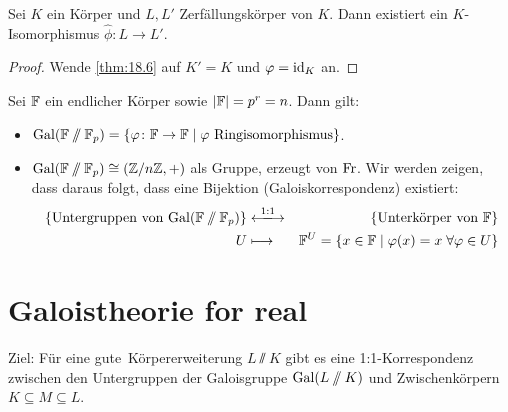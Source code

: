 \documentclass[12pt,a4paper]{scrartcl}
\begin{document}
\begin{satz}
	Sei $K$ ein Körper und $L, L'$ Zerfällungskörper von $K$. Dann existiert ein $K$-Isomorphismus $\hat\phi\colon L\to L'$. 
\end{satz}
\begin{proof}
	Wende \cref{thm:18.6} auf $K' = K$ und $\varphi = \operatorname{id}_K$ an.
\end{proof}
\begin{satz}
	Sei $\mathbb F$ ein endlicher Körper sowie $|\mathbb F| = p^r = n$. Dann gilt:
	\begin{itemize}
		\item $\operatorname{Gal}(\mathbb F\sslash\mathbb F_p) = \{\varphi\colon \mathbb F\to \mathbb F\mid\text{$\varphi$ Ringisomorphismus}\}$.
		\item $\operatorname{Gal}(\mathbb F\sslash\mathbb F_p) \cong (\mathbb Z/n\mathbb Z, +)$ als Gruppe, erzeugt von $\operatorname{Fr}$. Wir werden zeigen, dass daraus folgt, dass eine Bijektion \textup(Galoiskorrespondenz\textup) existiert:
		\begin{eqnarray*}
			\{\text{Untergruppen von $\Gal(\IF\sslash\IF_p)$}\}&\xlongleftrightarrow{1:1}&\{\text{Unterkörper von $\IF$}\}\\
			U &\longmapsto & \IF^U = \{x\in\IF\mid \phi(x) = x \;\forall \phi\in U\}
		\end{eqnarray*}
	\end{itemize}
\end{satz}


\section{Galoistheorie for real}
Ziel: Für eine \glqq gute\grqq\ Körpererweiterung $L\sslash K$ gibt es eine 1:1-Korrespondenz zwischen den Untergruppen der Galoisgruppe $\operatorname{Gal}(L\sslash K)$ und Zwischenkörpern $K\subseteq M \subseteq L$.
\end{document}
